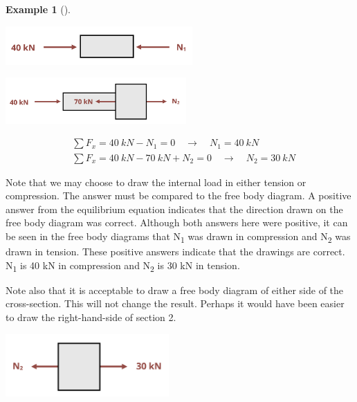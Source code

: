 \documentclass[
  letterpaper,
  DIV=11,
  numbers=noendperiod]{scrreprt}
\theoremstyle{definition}
\newtheorem{example}{Example}[chapter]
\theoremstyle{remark}
\begin{document}
\begin{tcolorbox}
\begin{example}[]
\begin{tcolorbox}
\begin{center}
\includegraphics[width=2.8125in,height=\textheight]{images/Updated CH2 examples/example 2.2 part 2.png}
\end{center}

\begin{center}
\includegraphics[width=2.71875in,height=\textheight]{images/Updated CH2 examples/example 2.2 part 3.png}
\end{center}

\[
\begin{aligned}
&\sum F_x=40{~kN}-N_1=0 \quad \rightarrow \quad N_1=40{~kN} \\
&\sum F_x=40{~kN}-70{~kN}+N_2=0 \quad \rightarrow \quad N_2=30{~kN}
\end{aligned}
\]

Note that we may choose to draw the internal load in either tension or
compression. The answer must be compared to the free body diagram. A
positive answer from the equilibrium equation indicates that the
direction drawn on the free body diagram was correct. Although both
answers here were positive, it can be seen in the free body diagrams
that N\textsubscript{1} was drawn in compression and N\textsubscript{2}
was drawn in tension. These positive answers indicate that the drawings
are correct. N\textsubscript{1} is 40 kN in compression and
N\textsubscript{2} is 30 kN in tension.

Note also that it is acceptable to draw a free body diagram of either
side of the cross-section. This will not change the result. Perhaps it
would have been easier to draw the right-hand-side of section 2.

\begin{center}
\includegraphics[width=2.45833in,height=\textheight]{images/Updated CH2 examples/example 2.2 part 4.png}
\end{center}


\end{tcolorbox}
\end{example}
\end{tcolorbox}
\end{document}
